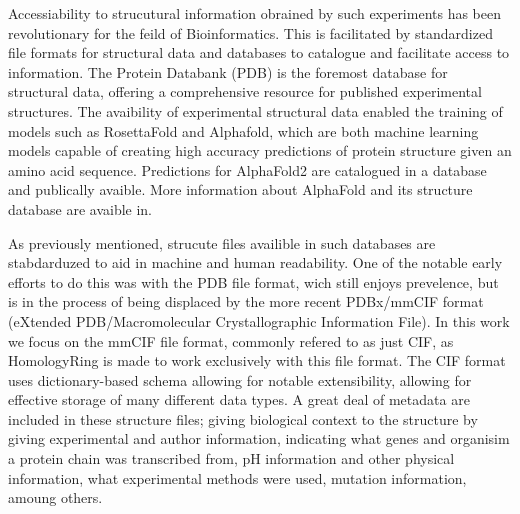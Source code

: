 Accessiability to strucutural information obrained by such experiments has been revolutionary for the feild of Bioinformatics. This is facilitated by standardized file formats for structural data and databases to catalogue and facilitate access to information. The Protein Databank (PDB) is the foremost database for structural data, offering a comprehensive resource for published experimental structures. 
The avaibility of experimental structural data enabled the training of models such as RosettaFold and Alphafold, which are both machine learning models capable of creating high accuracy predictions of protein structure given an amino acid sequence. Predictions for AlphaFold2 are catalogued in a database and publically avaible. More information about AlphaFold and its structure database are avaible in.

As previously mentioned, strucute files availible in such databases are stabdarduzed to aid in machine and human readability. One of the notable early efforts to do this was with the PDB file format, wich still enjoys prevelence, but is in the process of being displaced by the more recent PDBx/mmCIF format (eXtended PDB/Macromolecular Crystallographic Information File). In this work we focus on the mmCIF file format, commonly refered to as just CIF, as HomologyRing is made to work exclusively with this file format.
The CIF format uses dictionary-based schema allowing for notable extensibility, allowing for effective storage of many different data types. 
A great deal of metadata are included in these structure files; giving biological context to the structure by giving experimental and author information, indicating what genes and organisim a protein chain was transcribed from, pH information and other physical information, what experimental methods were used, mutation information, amoung others. 

